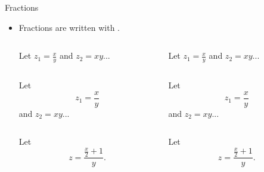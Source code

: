 \begin{frame}[fragile,c]{Fractions}
	\begin{itemize}
		\item Fractions are written with .
		\begin{columns}
			\begin{column}{.4\textwidth}
			\vspace{-4.5mm}
\begin{codesource}
	Let $z_1 = \frac{x}{y}$ and
	$z_2 = xy$...
\end{codesource}
			\end{column}
			\begin{column}{.4\textwidth}
				Let $z_1 = \frac{x}{y}$ and
				$z_2 = xy$...
			\end{column}
		\end{columns}
	
		\pause
		
		\begin{columns}
			\begin{column}{.4\textwidth}
				\vspace{-4.5mm}
\begin{codesource}
	Let
	\begin{equation*}
		z_1 = \frac{x}{y}
	\end{equation*}
	and $z_2 = xy$...
\end{codesource}
			\end{column}
			\begin{column}{.4\textwidth}
				Let
				\begin{equation*}
					z_1 = \frac{x}{y}
				\end{equation*}
				and $z_2 = xy$...
			\end{column}
		\end{columns}
	
		\pause
		
		\begin{columns}
			\begin{column}{.4\textwidth}
				\vspace{-4.5mm}
\begin{codesource}
	Let
	\begin{equation*}
		z = \frac{\frac{x}{2} + 1}{y}.
	\end{equation*}
\end{codesource}
			\end{column}
			\begin{column}{.4\textwidth}
				Let
				\begin{equation*}
					z = \frac{\frac{x}{2} + 1}{y}.
				\end{equation*}
			\end{column}
		\end{columns}
	\end{itemize}
\end{frame}

